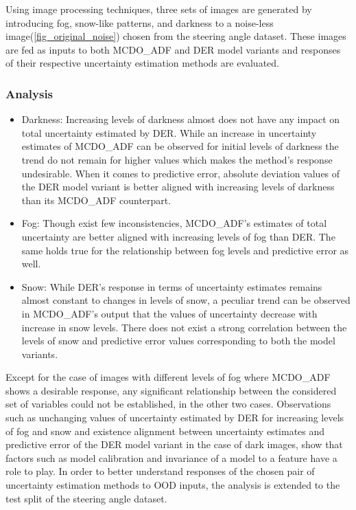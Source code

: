 Using image processing techniques, three sets of images are generated by introducing fog, snow-like patterns, and darkness to a noise-less image(\ref{fig_original_noise}) chosen from the steering angle dataset. These images are fed as inputs to both MCDO\_ADF and DER model variants and  responses of their respective uncertainty estimation methods are evaluated.
\subsubsection{Analysis}
\begin{itemize}
	\item Darkness: Increasing levels of darkness almost does not have any impact on total uncertainty estimated by DER. While an increase in uncertainty estimates of MCDO\_ADF can be observed for initial levels of darkness the trend do not remain for higher values which makes the method's response undesirable. When it comes to predictive error, absolute deviation values of the DER model variant is better aligned with increasing levels of darkness than its MCDO\_ADF counterpart. 
	\item Fog: Though exist few inconsistencies, MCDO\_ADF's estimates of total uncertainty are better aligned with increasing levels of fog than DER. The same holds true for the relationship between fog levels and predictive error as well.
	\item Snow: While DER's response in terms of uncertainty estimates remains almost constant to changes in levels of snow, a peculiar trend can be observed in MCDO\_ADF's output that the values of uncertainty decrease with increase in snow levels. There does not exist a strong correlation between the levels of snow and predictive error values corresponding to both the model variants. 
\end{itemize}
Except for the case of images with different levels of fog where MCDO\_ADF shows a desirable response, any significant relationship between the considered set of variables could not be established, in the other two cases. Observations such as unchanging values of uncertainty estimated by DER for increasing levels of fog and snow and existence alignment between uncertainty estimates and predictive error of the DER model variant in the case of dark images, show that factors such as model calibration and invariance of a model to a feature have a role to play. In order to better understand responses of the chosen pair of uncertainty estimation methods to OOD inputs, the analysis is extended to the test split of the steering angle dataset.
